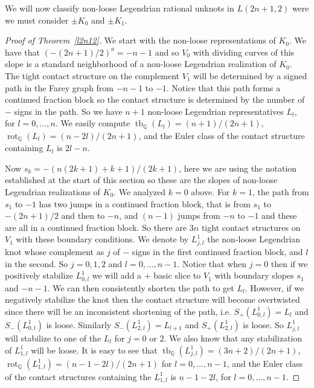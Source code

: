 \documentclass[11pt]{amsart}
\theoremstyle{plain}
\theoremstyle{definition}
\theoremstyle{remark}
\numberwithin{theorem}{section}
\newcommand{\Q}{\mathbb{Q}}           %
\DeclareMathOperator\tb{tb}                   %
\DeclareMathOperator\rot{rot}                 %
\begin{document}
We will now classify non-loose Legendrian rational unknots in $L(2n+1,2)$ were we must consider $\pm K_0$ and $\pm K_1$. 
\begin{proof}[Proof of Theorem~\ref{l2n12}]
We start with the non-loose representations of $K_0$. We have that $(-(2n+1)/2)^a= -n-1$ and so $V_0$ with dividing curves of this slope is a standard neighborhood of a non-loose Legendrian realization of $K_0$. The tight contact structure on the complement $V_1$ will be determined by a signed path in the Farey graph from $-n-1$ to $-1$. Notice that this path forms a continued fraction block so the contact structure is determined by the number of $-$ signs in the path. So we have $n+1$ non-loose Legendrian representatives $L_l$, for $l=0, \dots, n$. We easily compute $\tb_\Q(L_l)=(n+1)/(2n+1)$, $\rot_\Q(L_l)= (n-2l)/(2n+1)$, and the Euler class of the contact structure containing $L_l$ is $2l-n$. 

Now  $s_k=-(n(2k+1)+k+1)/(2k+1)$, here we are using the notation established at the start of this section so these are the slopes of non-loose Legendrian realizations of $K_0$. We analyzed $k=0$ above. For $k=1$, the path from $s_1$ to $-1$ has two jumps in a continued fraction block, that is from $s_1$ to $-(2n+1)/2$ and then to $-n$, and $(n-1)$ jumps from $-n$ to $-1$ and these are all in a continued fraction block. So there are $3n$ tight contact structures on $V_1$ with these boundary conditions. We denote by $L^1_{j,l}$ the non-loose Legendrian knot whose complement as $j$ of $-$ signs in the first continued fraction block, and $l$ in the second. So $j=0,1,2$ and $l=0,\ldots, n-1$. Notice that when $j=0$ then if we positively stabilize $L^1_{0,l}$ we will add a $+$ basic slice to $V_1$ with boundary slopes $s_1$ and $-n-1$. We can then consistently shorten the path to get $L_l$. However, if we negatively stabilize the knot then the contact structure will become overtwisted since there will be an inconsistent shortening of the path, i.e. $S_+(L^1_{0,l}) = L_l$ and $S_-(L^1_{0,l})$ is loose. Similarly $S_-(L^1_{2,l})=L_{l+1}$ and $S_+(L^1_{2,l})$ is loose. So $L^1_{j,l}$ will stabilize to one of the $L_l$ for $j=0$ or $2$. We also know that any stabilization of $L^1_{1,l}$ will be loose. It is easy to see that $\tb_\Q(L^1_{j,l})= (3n+2)/(2n+1)$, $\rot_\Q(L^1_{1,l})=(n-1-2l)/(2n+1)$ for $l=0,\ldots, n-1$, and the Euler class of the contact structures containing the $L^1_{1,l}$ is $n-1-2l$, for $l=0,\ldots, n-1$. 


\end{proof}
\end{document}
